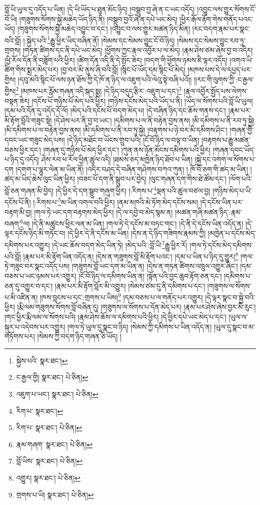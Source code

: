 བློ་ཡི་ཡུལ་དུ་འདོད་པ་ཡིན། །དེ་ཡི་ཡོད་པ་ཐུན་མོང་ཉིད། །བསྒྲུབ་བྱ་ཞེ་ན་ང་ཡང་འདོད། །འབྱུང་ལས་གྱུར་སོགས་ངོ་བོ་ཡི། །གཟུགས་སོགས་སྐྱེ་མཆེད་ཡོད་ཉིད་ནི། །བསྒྲུབ་བྱའོ་ཞེ་ན་དཔེ་ཡང་མེད། །ཕྱིར་རྒོལ་རྟོག་གེས་གནོད་པའང་ཡོད། །གཟུགས་སོགས་སྐྱེ་མཆེད་འབྱུང་བ་དང་། །འབྱུང་བ་ལས་གྱུར་མཚན་ཉིད་མིན། །རང་བདག་རྣམ་པར་སྣང་བའི་བློ། །:སྐྱེད་པའི་\footnote{སྐྱེས་པའི་  སྣར་ཐང་། }རྒྱུ་ཕྱིར་ཡིད་བཞིན་ནོ། །སེམས་དང་སེམས་བྱུང་ངོ་བོ་ཉིད། །སེམས་དང་སེམས་བྱུང་རབ་ཏུ་གྲགས། །གཏན་ཚིགས་དང་ནི་དཔེ་ཡང་མེད། །ཕྱོགས་ཀྱང་རྣལ་འབྱོར་པ་ལ་མེད། །རྣམ་ཤེས་ཙམ་ཞེས་བྱ་བ་འདིར། །ཕྱི་རོལ་དོན་ནི་བཟློག་པའི་ཕྱིར། །ཚིག་དོན་འདི་ནི་དེ་སྤོང་ཟེར། །བདག་གི་ཕྱོགས་ཉམས་ཇི་ལྟར་འདོད། །འགའ་ཡི་ཚིག་གིས་སྨྲར་མེད་པར། །བྱ་བར་མི་ནུས་ཞི་བའི་བློ། །སྙིང་པོ་ཡོད་དམ་སྙིང་པོ་མེད། །མཁས་པས་དེ་ལ་དཔྱད་པར་གྱིས། །དབུ་མའི་སྙིང་པོ་ལས་ཉན་ཐོས་ཀྱི་དེ་ཁོ་ན་ཉིད་ལ་འཇུག་པའི་ལེའུ་སྟེ་བཞི་པའོ།། །།རང་གི་ལུགས་ཀྱི་:ང་རྒྱལ་གྱིས།\footnote{ང་རྒྱལ་གྱི།  སྣར་ཐང་།  པེ་ཅིན། } །མཁས་པར་རློམ་གཞན་འདི་སྐད་སྨྲ། །དེ་ཉིད་བདུད་རྩིར་:འཇུག་པ་དང་།\footnote{འཇུག་པ་ཡང་།  སྣར་ཐང་།  པེ་ཅིན། } །རྣལ་འབྱོར་སྤྱོད་པས་ལེགས་བསྟན་ཟེར། །དངོས་པོ་གཉིས་པོ་མེད་པའི་ཕྱིར། །གཉིས་དངོས་མེད་པའི་ཡོད་པ་ནི། །ཡོད་ལ་སོགས་པའི་བློ་ཡི་ཡུལ། །དམ་པའི་དོན་དུ་འདོད་དོ་ལོ། །མེད་པའི་དངོས་པོ་བདག་མེད་པ། །དེ་བཞིན་ཉིད་དང་ཆོས་གནས་དང་། །རྣམ་པར་མི་རྟོག་བློའི་གཟུང་སྟེ། །དེ་ཤེས་པར་ནི་བྱ་བ་ཡང་། །དམིགས་པ་ལ་ནི་བརྟེན་བྱས་ནས། །མི་དམིགས་པ་ནི་རབ་ཏུ་སྐྱེ། །མི་དམིགས་པ་ལ་བརྟེན་བྱས་ནས། །མི་དམིགས་པ་ནི་རབ་ཏུ་སྐྱེ། །བརྟགས་པ་ཉེ་བར་མི་དམིགས་ཤིང་། །གཞན་གྱི་དབང་ཡང་གཟུང་མེད་པས། །དེ་ཉིད་མཐོང་བ་ཡོངས་གྲུབ་པའི། །ངོ་བོ་ཉིད་ལ་བལྟ་བ་ཡིན། །བརྟགས་པ་རྒྱུ་མཚན་བཅས་ཕྱིར་དང་། །གཞན་དུ་གཉིས་པོ་མེད་ཕྱིར་དང་། །ཀུན་ནས་ཉོན་མོངས་དམིགས་པའི་ཕྱིར། །གཞན་དབང་ཡོད་པ་ཉིད་དུ་འདོད། ཤེས་རབ་ཕ་རོལ་ཕྱིན་ཚུལ་འདི། །ཐམས་ཅད་མཁྱེན་ཉིད་ཐོབ་པ་ཡིན། །སྐྱེ་དང་འགག་ལ་སོགས་པ་དག །དགག་པ་ལྷུར་ལེན་མ་ཡིན་ནོ། །འདིར་བཤད་དེ་བཞིན་གཤེགས་བཀའ་ཀུན། །
ཁོ་བོ་ཅག་གི་ཚད་མ་ཡིན། །ཚད་མ་ཡིད་ཆེས་ལུང་ཡིན་ཕྱིར། །བཟང་པོ་དག་ནི་སྒྲུབ་པར་བྱེད། །ལུང་གཞན་དག་གིས་ཐེ་ཚོམ་དང་། །ལོག་པའི་བློ་ཅན་གཞན་མི་བྱེད། །དེ་ཕྱིར་དེ་དག་སྒྲུབ་གཞུག་ཕྱིར། །:རིགས་པ་\footnote{རིག་པ་  སྣར་ཐང་། }ལྡན་པའི་ཚུལ་བཙལ་བྱ། །གཉིས་མེད་པ་ཡི་དངོས་པོ་ནི། །:རིགས་པ་\footnote{རིག་པ་  སྣར་ཐང་།  པེ་ཅིན། }མ་ཡིན་འགལ་བའི་ཕྱིར། །ནམ་མཁའི་མེ་ཏོག་མེད་དངོས་སམ། །དེ་དངོས་ཡིན་པར་བརྟག་མི་བྱ། །གལ་ཏེ་ཡང་དག་བརྟགས་མེད་ཕྱིར། །དེ་ལ་དབྱེ་བ་མེད་སྙམ་ན། །མཚན་གཞི་མཚན་ཉིད་:རྣམ་བཞག་\footnote{རྣམ་གཞག་  སྣར་ཐང་།  པེ་ཅིན། }ལ། །དེ་ནི་མཚུངས་ཕྱིར་ལན་མ་ཡིན། །གལ་ཏེ་དེ་དངོས་མ་བཏང་གང་། །དེ་ནི་དེ་དངོས་ཡིན་འདོད་ན། །དེ་ལྟར་དངོས་ཉིད་མི་གཏོང་བ། །དེ་ཕྱིར་དེ་ནི་དངོས་མ་ཡིན། །དེས་ན་དེ་ཉིད་གཟིགས་རྣམས་ཀྱི། །མཁྱེན་པ་དངོས་མེད་དམིགས་པར་འགྱུར། །དེ་ཡང་ཆོས་བདག་མེད་ཡིན་ཏེ། །མེད་པའི་:བློ་ཡི་\footnote{བློ་ཡིས་  སྣར་ཐང་།  པེ་ཅིན། }རྒྱུ་ཕྱིར་རོ། །གལ་ཏེ་དངོས་མེད་དམིགས་པའི་བློ། །རྣམ་པར་མི་རྟོག་ཡིན་འདོད་ན། །དེས་ན་གཟུགས་བློ་མི་རྟོག་པའང་། །དམ་པ་ཡིན་པ་ཉིད་དུ་གྱུར།\footnote{འགྱུར།  སྣར་ཐང་།  པེ་ཅིན། } །གལ་ཏེ་གཟུང་བར་སྣང་འདོད་པས། །གཟུགས་བློ་ཡང་དག་མ་ཡིན་ན། །དེས་ན་གཏན་ཚིགས་འཁྲུལ་འགྱུར་ཞིང་། །དམ་བཅས་པ་ཡང་ཉམས་པར་འགྱུར། །ངོ་བོ་ཉིད་ལ་དམིགས་ཡིན་ན། །སྟོན་པའི་བྱང་ཆུབ་རྟོག་ཅན་དང་། །དམིགས་པ་ཅན་དུ་འགྱུར་བ་དང་། །རྣམ་པར་མི་རྟོག་བློར་མི་འགྱུར། །སེམས་ཙམ་དུ་ནི་དམིགས་པ་དང་། །གཟུགས་ལ་སོགས་པ་མི་འཛིན་ན། །ཁས་བླངས་པ་དང་:གྲགས་པ་ཡིས།\footnote{གྲགས་པ་ཡི།  སྣར་ཐང་།  པེ་ཅིན། } །དམ་བཅས་པ་ལ་གནོད་པར་འགྱུར། །དེ་ལྟར་སྣང་བ་སྐྱེ་བའི་ཕྱིར། །རྨི་ལམ་གཟུགས་སོགས་བློ་བཞིན་དུ། །གཟུགས་ལ་སོགས་པ་དོན་མེད་པར། །རྣམ་པར་ཤེས་ཞེས་བྱར་མི་རུང་། །གང་ཕྱིར་རྨི་ལམ་ལ་སོགས་པའི། །རྣམ་ཤེས་ཆོས་ལ་དམིགས་པའི་ཕྱིར། །དེ་ཕྱིར་དཔེ་ཡང་མེད་པ་དང་། །ཡུལ་ལ་སྐུར་པ་འདེབས་པར་འགྱུར། །གལ་ཏེ་ཡུལ་དུ་སྣང་བ་ཉིད། །སེམས་ཀྱི་དམིགས་པ་ཡིན་འདོད་ན། །ཡུལ་དུ་སྣང་བ་མ་གཏོགས་པར། །སེམས་ཀྱི་བདག་ཉིད་གཞན་ཅི་ཡོད། །
